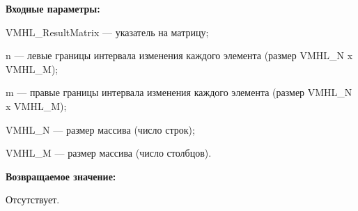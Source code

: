 \textbf{Входные параметры:}
 
VMHL\_ResultMatrix --- указатель на матрицу;
 
n --- левые границы интервала изменения каждого элемента (размер VMHL\_N x VMHL\_M);
 
m --- правые границы интервала изменения каждого элемента (размер VMHL\_N x VMHL\_M);
 
VMHL\_N --- размер массива (число строк);
 
VMHL\_M --- размер массива (число столбцов).

\textbf{Возвращаемое значение:}

Отсутствует.